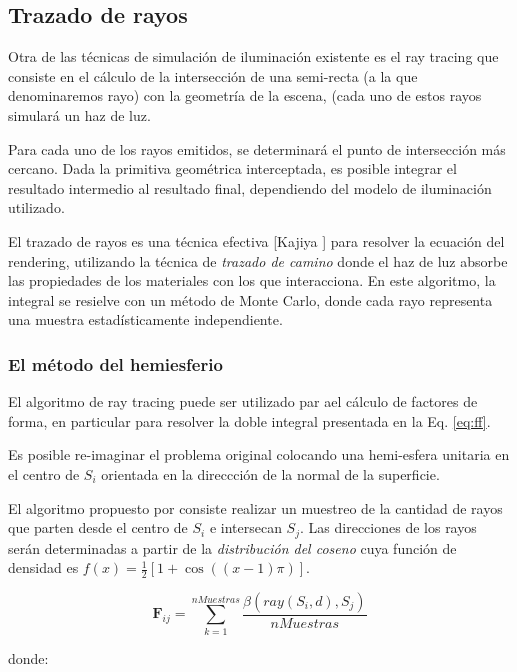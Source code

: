 \subsection{Trazado de rayos}
\label{sec:raytracing}

Otra de las técnicas de simulación de iluminación existente es el ray tracing que consiste en el cálculo de la intersección de una semi-recta (a la que denominaremos rayo) con la geometría de la escena, (cada uno de estos rayos simulará un haz de luz.

Para cada uno de los rayos emitidos, se determinará el punto de intersección más cercano. Dada la primitiva geométrica interceptada, es posible integrar el resultado intermedio al resultado final, dependiendo del modelo de iluminación utilizado.

El trazado de rayos es una técnica efectiva [Kajiya \cite{Kajiya}] para resolver la ecuación del rendering, utilizando la técnica de \textit{trazado de camino} donde el haz de luz absorbe las propiedades de los materiales con los que interacciona. En este algoritmo, la integral se resielve con un método de Monte Carlo, donde cada rayo representa una muestra estadísticamente independiente.

\subsubsection{El método del hemiesferio}

El algoritmo de ray tracing puede ser utilizado par ael cálculo de factores de forma, en particular para resolver la doble integral presentada en la Eq. \eqref{eq:ff}.

Es posible re-imaginar el problema original colocando una hemi-esfera unitaria en el centro de $S_{i}$ orientada en la direccción de la normal de la superficie.

El algoritmo propuesto por \citeauthor{Malley}  consiste realizar un muestreo de la cantidad de  rayos que parten desde el centro de $S_{i}$ e intersecan $S_{j}$. Las direcciones de los rayos serán determinadas a partir de la \textit{distribución del coseno} cuya función de densidad es $f(x) = \frac{1}{2}[1 + \cos((x-1)\pi)]$.

\begin{equation}
	\mathbf{F}_{ij} = \sum_{k=1}^{nMuestras} \frac{\beta(ray(S_{i},d), S_{j})}{nMuestras} 
	\label{eq:ffhemiesfera}
\end{equation}

donde:
	
